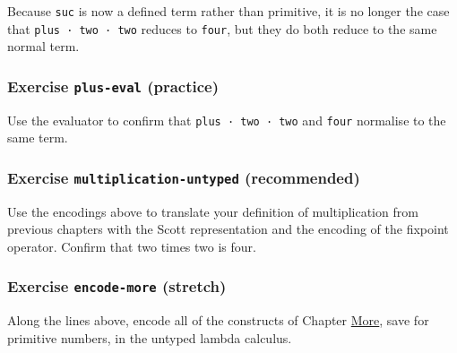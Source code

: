 Because \texttt{\textasciigrave{}suc} is now a defined term rather than
primitive, it is no longer the case that \texttt{plus\ ·\ two\ ·\ two}
reduces to \texttt{four}, but they do both reduce to the same normal
term.

\hypertarget{exercise-plus-eval-practice}{%
\subsubsection{\texorpdfstring{Exercise \texttt{plus-eval}
(practice)}{Exercise plus-eval (practice)}}\label{exercise-plus-eval-practice}}

Use the evaluator to confirm that \texttt{plus\ ·\ two\ ·\ two} and
\texttt{four} normalise to the same term.

\begin{fence}
\begin{code}%
\>[0]\<%
\end{code}
\end{fence}

\hypertarget{exercise-multiplication-untyped-recommended}{%
\subsubsection{\texorpdfstring{Exercise \texttt{multiplication-untyped}
(recommended)}{Exercise multiplication-untyped (recommended)}}\label{exercise-multiplication-untyped-recommended}}

Use the encodings above to translate your definition of multiplication
from previous chapters with the Scott representation and the encoding of
the fixpoint operator. Confirm that two times two is four.

\begin{fence}
\begin{code}%
\>[0]\<%
\end{code}
\end{fence}

\hypertarget{exercise-encode-more-stretch}{%
\subsubsection{\texorpdfstring{Exercise \texttt{encode-more}
(stretch)}{Exercise encode-more (stretch)}}\label{exercise-encode-more-stretch}}

Along the lines above, encode all of the constructs of Chapter
\protect\hyperlink{More}{More}, save for primitive numbers, in the
untyped lambda calculus.


